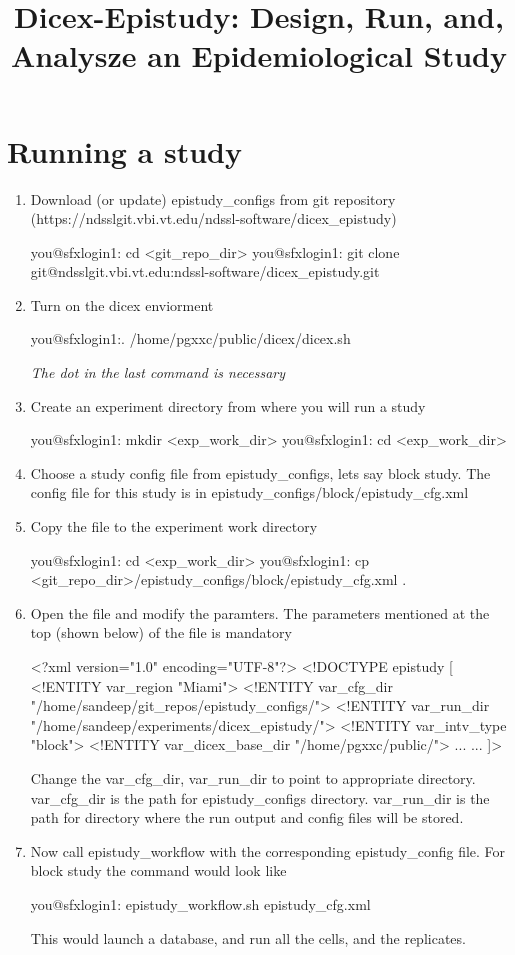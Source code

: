 \documentclass[11]{report}
\title{Dicex-Epistudy: Design, Run, and, Analysze an Epidemiological Study}
\begin{document}
\maketitle
\tableofcontents

\chapter{Running a study}
\begin{enumerate}
\item Download (or update) epistudy\_configs from git repository (https://ndsslgit.vbi.vt.edu/ndssl-software/dicex\_epistudy) 
\begin{code}
you@sfxlogin1: cd <git_repo_dir>
you@sfxlogin1: git clone git@ndsslgit.vbi.vt.edu:ndssl-software/dicex_epistudy.git
\end{code}
\item Turn on the dicex enviorment
\begin{code}
you@sfxlogin1:. /home/pgxxc/public/dicex/dicex.sh
\end{code}
\emph {The dot in the last command is necessary}
\item Create an experiment directory from where you will run a study
\begin{code}
you@sfxlogin1: mkdir <exp_work_dir>
you@sfxlogin1: cd <exp_work_dir>
\end{code}
\item Choose a study config file from epistudy\_configs, lets say block study. The config file for this study is in epistudy\_configs/block/epistudy\_cfg.xml
\item Copy the file to the experiment work directory
\begin{code}
you@sfxlogin1: cd <exp_work_dir>
you@sfxlogin1: cp <git_repo_dir>/epistudy_configs/block/epistudy_cfg.xml .
\end{code}

\item Open the file and modify the paramters. The parameters mentioned at the top (shown below) of the file is mandatory 
\begin{code}
<?xml version="1.0" encoding="UTF-8"?>
<!DOCTYPE epistudy [
<!ENTITY var_region "Miami">
<!ENTITY var_cfg_dir "/home/sandeep/git_repos/epistudy_configs/">
<!ENTITY var_run_dir "/home/sandeep/experiments/dicex_epistudy/">
<!ENTITY var_intv_type "block">
<!ENTITY var_dicex_base_dir "/home/pgxxc/public/">
...
...
]>
\end{code}
Change the var\_cfg\_dir, var\_run\_dir to point to appropriate directory. var\_cfg\_dir is 
the path for epistudy\_configs directory. var\_run\_dir is the path for directory where the
run output and config files will be stored. 
\item Now call epistudy\_workflow with the corresponding epistudy\_config file. For block study the command
would look like
\begin{code}
you@sfxlogin1: epistudy_workflow.sh epistudy_cfg.xml
\end{code}
This would launch a database, and run all the  cells, and the replicates. 
\end{enumerate}
\end{document}
